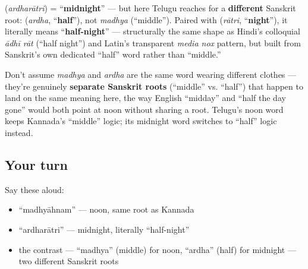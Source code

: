 \begin{cousinweb}
\textbf{} (\emph{ardharātri}) = \textquotedblleft{}\textbf{midnight}\textquotedblright{} — but here Telugu reaches for a \textbf{different} Sanskrit root: \textbf{} (\emph{ardha}, \textquotedblleft{}\textbf{half}\textquotedblright{}), not \emph{madhya} (\textquotedblleft{}middle\textquotedblright{}). Paired with \textbf{} (\emph{rātri}, \textquotedblleft{}\textbf{night}\textquotedblright{}), it literally means \textquotedblleft{}\textbf{half-night}\textquotedblright{} — structurally the same shape as Hindi's colloquial \emph{ādhī rāt} (\textquotedblleft{}half night\textquotedblright{}) and Latin's transparent \emph{media nox} pattern, but built from Sanskrit's own dedicated \textquotedblleft{}half\textquotedblright{} word rather than \textquotedblleft{}middle.\textquotedblright{}
\end{cousinweb}

\begin{grammarlens}[title={Grammar Lens: Be honest: two different \textquotedblleft{}middle-ish\textquotedblright{} ideas, side by side}]
Don't assume \emph{madhya} and \emph{ardha} are the same word wearing different clothes — they're genuinely \textbf{separate Sanskrit roots} (\textquotedblleft{}middle\textquotedblright{} vs. \textquotedblleft{}half\textquotedblright{}) that happen to land on the same meaning here, the way English \textquotedblleft{}midday\textquotedblright{} and \textquotedblleft{}half the day gone\textquotedblright{} would both point at noon without sharing a root. Telugu's noon word keeps Kannada's \textquotedblleft{}middle\textquotedblright{} logic; its midnight word switches to \textquotedblleft{}half\textquotedblright{} logic instead.
\end{grammarlens}

\subsection*{Your turn}
Say these aloud:

\begin{itemize}
\raggedright
  \item \textquotedblleft{}madhyāhnam\textquotedblright{} — noon, same root as Kannada
  \item \textquotedblleft{}ardharātri\textquotedblright{} — midnight, literally \textquotedblleft{}half-night\textquotedblright{}
  \item the contrast — \textquotedblleft{}madhya\textquotedblright{} (middle) for noon, \textquotedblleft{}ardha\textquotedblright{} (half) for midnight — two different Sanskrit roots
\end{itemize}

